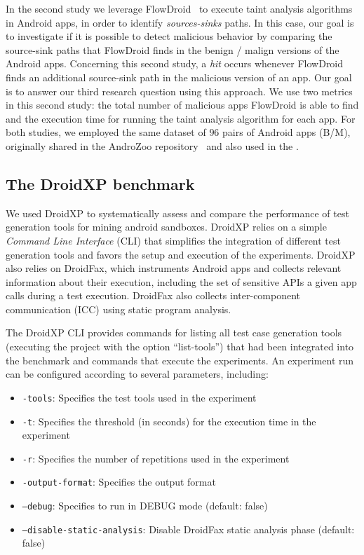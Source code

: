 In the second study we leverage FlowDroid~\cite{DBLP:conf/pldi/ArztRFBBKTOM14} to execute
taint analysis algorithms in Android apps, in order to identify \emph{sources-sinks} paths. In this case,
our goal is to investigate if it is possible to detect malicious
behavior by comparing the source-sink paths that FlowDroid finds in the
benign / malign versions of the Android apps. Concerning this second study, a \emph{hit} occurs whenever
FlowDroid finds an additional source-sink path in the malicious version of an app.
Our goal is to answer our third research question using this approach. We use two metrics in this second study:
the total number of malicious apps FlowDroid is able to find and the
execution time for running the taint analysis algorithm for each app.
For both studies, we employed the same dataset of $96$ pairs of Android apps (B/M),
originally shared in the AndroZoo repository~\cite{DBLP:conf/msr/AllixBKT16} and
also used in the \blls. 

\subsection{The DroidXP benchmark}\label{sec:droidxp}

We used DroidXP to systematically assess and compare the performance of test generation tools for mining android sandboxes. DroidXP relies on a
simple \emph{Command Line Interface} (CLI) that simplifies the integration of different test generation tools and favors the setup and execution 
of the experiments. DroidXP also relies on DroidFax, which instruments Android apps and collects relevant information about
their execution, including the set of sensitive APIs a given
app calls during a test execution. DroidFax also collects inter-component communication (ICC) using  static
program analysis.


The DroidXP CLI provides commands for listing all test case
generation tools (executing the project with the option ``list-tools'') that had been
integrated into the benchmark and commands that execute the experiments. An
experiment run can be configured according to several parameters, including:

\begin{itemize}
    \item \texttt{-tools}: Specifies the test tools used in the experiment
    \item \texttt{-t}: Specifies the threshold (in seconds) for the execution time in the experiment
    \item \texttt{-r}: Specifies the number of repetitions used in the experiment
    \item \texttt{-output-format}: Specifies the output format
    \item \texttt{--debug}: Specifies to run in DEBUG mode (default: false)
    \item \texttt{--disable-static-analysis}: Disable DroidFax static analysis phase (default: false)
\end{itemize}

